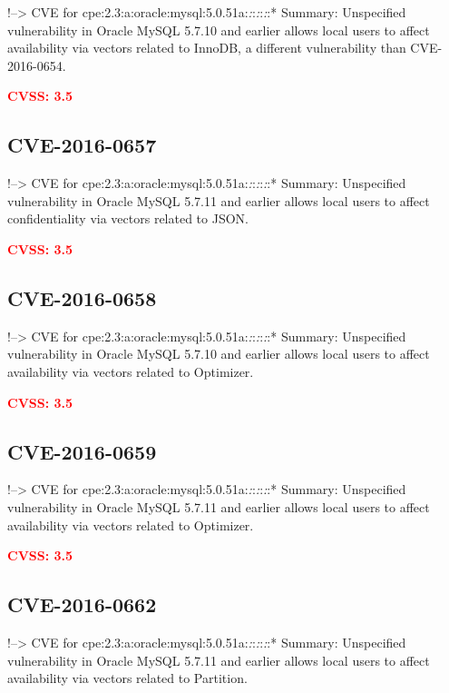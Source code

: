 \documentclass[a4paper, 12pt]{article}
\begin{document}
!--\textgreater{} CVE for
cpe:2.3:a:oracle:mysql:5.0.51a:\emph{:}:\emph{:}:\emph{:}:* Summary:
Unspecified vulnerability in Oracle MySQL 5.7.10 and earlier allows
local users to affect availability via vectors related to InnoDB, a
different vulnerability than CVE-2016-0654.

\textbf{\textcolor{red}{CVSS: 3.5}}

\hypertarget{cve-2016-0657}{%
\subsection{CVE-2016-0657}\label{cve-2016-0657}}

!--\textgreater{} CVE for
cpe:2.3:a:oracle:mysql:5.0.51a:\emph{:}:\emph{:}:\emph{:}:* Summary:
Unspecified vulnerability in Oracle MySQL 5.7.11 and earlier allows
local users to affect confidentiality via vectors related to JSON.

\textbf{\textcolor{red}{CVSS: 3.5}}

\hypertarget{cve-2016-0658}{%
\subsection{CVE-2016-0658}\label{cve-2016-0658}}

!--\textgreater{} CVE for
cpe:2.3:a:oracle:mysql:5.0.51a:\emph{:}:\emph{:}:\emph{:}:* Summary:
Unspecified vulnerability in Oracle MySQL 5.7.10 and earlier allows
local users to affect availability via vectors related to Optimizer.

\textbf{\textcolor{red}{CVSS: 3.5}}

\hypertarget{cve-2016-0659}{%
\subsection{CVE-2016-0659}\label{cve-2016-0659}}

!--\textgreater{} CVE for
cpe:2.3:a:oracle:mysql:5.0.51a:\emph{:}:\emph{:}:\emph{:}:* Summary:
Unspecified vulnerability in Oracle MySQL 5.7.11 and earlier allows
local users to affect availability via vectors related to Optimizer.

\textbf{\textcolor{red}{CVSS: 3.5}}

\hypertarget{cve-2016-0662}{%
\subsection{CVE-2016-0662}\label{cve-2016-0662}}

!--\textgreater{} CVE for
cpe:2.3:a:oracle:mysql:5.0.51a:\emph{:}:\emph{:}:\emph{:}:* Summary:
Unspecified vulnerability in Oracle MySQL 5.7.11 and earlier allows
local users to affect availability via vectors related to Partition.
\end{document}
